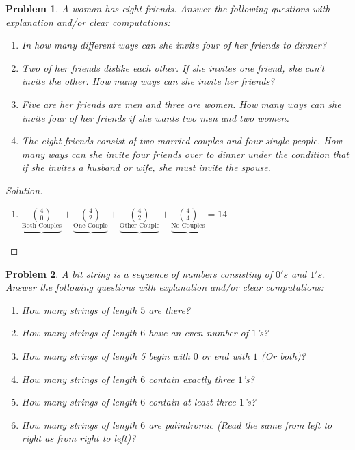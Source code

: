 \documentclass[oneside]{book}
\theoremstyle{mystyle}
\newtheorem{problem}{Problem}[section]
\begin{document}
\begin{problem}
A woman has eight friends. Answer the following questions with explanation and/or clear computations:
\begin{enumerate}
    \item In how many different ways can she invite four of her friends to dinner?
    \item Two of her friends dislike each other. If she invites one friend, she can't invite the other. How many ways can she invite her friends?
    \item Five are her friends are men and three are women. How many ways can she invite four of her friends if she wants two men and two women.
    \item The eight friends consist of two married couples and four single people. How many ways can she invite four friends over to dinner under the condition that if she invites a husband or wife, she must invite the spouse. 
\end{enumerate}
\end{problem}
\begin{proof}[Solution]
\
\begin{enumerate}
\begin{multicols}{3}
    \item $\binom{8}{4} = 70$.
    \item $\binom{6}{3} + \binom{6}{3} + \binom{6}{4} = 55$
    \item $\binom{5}{2}\binom{3}{2} = 30$
\end{multicols}
    \item $\underbrace{\underset{\textrm{Both Couples}}{\binom{4}{0}}}+\underbrace{\underset{\textrm{One Couple}}{\binom{4}{2}}}+\underbrace{\underset{\textrm{Other Couple}}{\binom{4}{2}}}+\underbrace{\underset{\textrm{No Couples}}{\binom{4}{4}}} = 14$
\end{enumerate}
\end{proof}
\begin{problem}
A bit string is a sequence of numbers consisting of $0's$ and $1's$. Answer the following questions with explanation and/or clear computations:
\begin{enumerate}
    \item How many strings of length $5$ are there?
    \item How many strings of length $6$ have an even number of $1$'s?
    \item How many strings of length 5 begin with $0$ or end with $1$ (Or both)?
    \item How many strings of length $6$ contain exactly three $1$'s?
    \item How many strings of length $6$ contain at least three $1$'s?
    \item How many strings of length $6$ are palindromic (Read the same from left to right as from right to left)?
\end{enumerate}
\end{problem}
\end{document}
